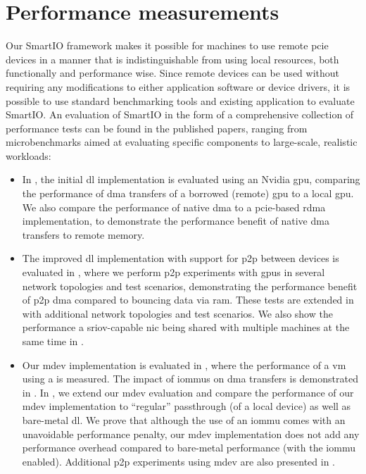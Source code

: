 \section{Performance measurements}\label{sec:eval}
Our SmartIO framework makes it possible for machines to use remote \gls{pcie} devices in a manner that is indistinguishable from using local resources, both functionally and performance wise.
%
Since remote devices can be used without requiring any modifications to either application software or device drivers, it is possible to use standard benchmarking tools and existing application to evaluate SmartIO.
%
An evaluation of SmartIO in the form of a comprehensive collection of performance tests can be found in the published papers, ranging from microbenchmarks aimed at evaluating specific components to large-scale, realistic workloads:
%
\begin{itemize}

    \item In , the initial \gls{dl} implementation is evaluated using an Nvidia \gls{gpu}, comparing the performance of \gls{dma} transfers of a borrowed (remote) \gls{gpu} to a local \gls{gpu}.
        We also compare the performance of native \gls{dma} to a \gls{pcie}-based \gls{rdma} implementation, to demonstrate the performance benefit of native \gls{dma} transfers to remote memory.


    \item The improved \gls{dl} implementation with support for \gls{p2p} between devices is evaluated in , where we perform \gls{p2p} experiments with \glspl{gpu} in several network topologies and test scenarios, demonstrating the performance benefit of \gls{p2p} \gls{dma} compared to bouncing data via \gls{ram}.
        These tests are extended in  with additional network topologies and test scenarios.
        We also show the performance a \gls{sriov}-capable \gls{nic} being shared with multiple machines at the same time in .



    \item Our \gls{mdev} implementation is evaluated in , where the performance of a \gls{vm} using a  is measured.
        The impact of \glspl{iommu} on \gls{dma} transfers is demonstrated in .
        In , we extend our \gls{mdev} evaluation and compare the performance of our \gls{mdev} implementation to ``regular'' \gls{passthrough} (of a local device) as well as bare-metal \gls{dl}.
        We prove that although the use of an \gls{iommu} comes with an unavoidable performance penalty, our \gls{mdev} implementation does not add any performance overhead compared to bare-metal performance (with the \gls{iommu} enabled).
        Additional \gls{p2p} experiments using \gls{mdev} are also presented in .
        



\end{itemize}
